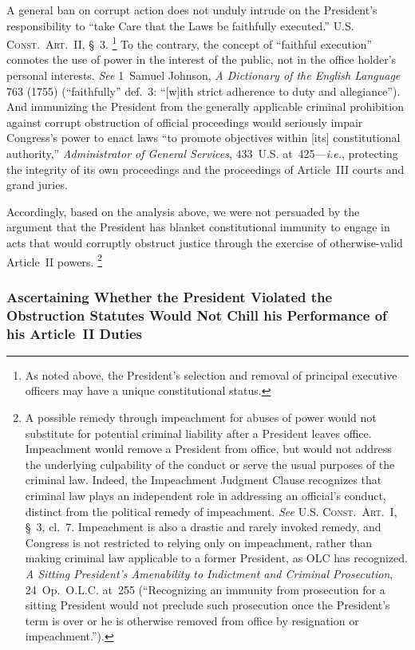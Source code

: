 A general ban on corrupt action does not unduly intrude on the President's responsibility to ``take Care that the Laws be faithfully executed.''
\textsc{U.S. Const.\ Art.~II}, \S~3.%
\footnote{As noted above, the President's selection and removal of principal executive officers may have a unique constitutional status.}
To the contrary, the concept of ``faithful execution'' connotes the use of power in the interest of the public, not in the office holder's personal interests.
\textit{See} 1~Samuel Johnson, \textit{A Dictionary of the English Language} 763 (1755) (``faithfully'' def.~3: ``[w]ith strict adherence to duty and allegiance'').
And immunizing the President from the generally applicable criminal prohibition against corrupt obstruction of official proceedings would seriously impair Congress's power to enact laws ``to promote objectives within [its] constitutional authority,'' \textit{Administrator of General Services}, 433~U.S. at~425---\textit{i.e.}, protecting the integrity of its own proceedings and the proceedings of Article~III courts and grand juries.

Accordingly, based on the analysis above, we were not persuaded by the argument that the President has blanket constitutional immunity to engage in acts that would corruptly obstruct justice through the exercise of otherwise-valid Article~II powers.%
\footnote{A possible remedy through impeachment for abuses of power would not substitute for potential criminal liability after a President leaves office.
Impeachment would remove a President from office, but would not address the underlying culpability of the conduct or serve the usual purposes of the criminal law.
Indeed, the Impeachment Judgment Clause recognizes that criminal law plays an independent role in addressing an official's conduct, distinct from the political remedy of impeachment.
\textit{See} \textsc{U.S. Const.\ Art.~I}, \S~3, cl.~7.
Impeachment is also a drastic and rarely invoked remedy, and Congress is not restricted to relying only on impeachment, rather than making criminal law applicable to a former President, as OLC has recognized.
\textit{A Sitting President's Amenability to Indictment and Criminal Prosecution}, 24~Op.\ O.L.C. at~255 (``Recognizing an immunity from prosecution for a sitting President would not preclude such prosecution once the President's term is over or he is otherwise removed from office by resignation or impeachment.'').}

\subsubsection{Ascertaining Whether the President Violated the Obstruction Statutes Would Not Chill his Performance of his Article~II Duties}

